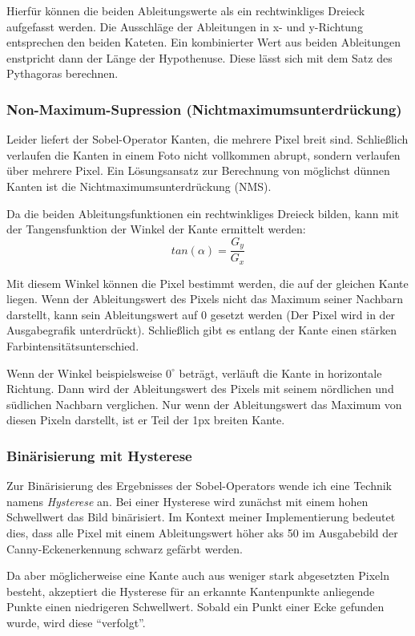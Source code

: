 Hierfür können die beiden Ableitungswerte als ein rechtwinkliges Dreieck aufgefasst werden. Die Ausschläge der Ableitungen in x- und y-Richtung entsprechen den beiden Kateten. Ein kombinierter Wert aus beiden Ableitungen enstpricht dann der Länge der Hypothenuse. Diese lässt sich mit dem Satz des Pythagoras berechnen.

\subsubsection{Non-Maximum-Supression (Nichtmaximumsunterdrückung)}
Leider liefert der Sobel-Operator Kanten, die mehrere Pixel breit sind. Schließlich verlaufen die Kanten in einem Foto nicht vollkommen abrupt, sondern verlaufen über mehrere Pixel. 
Ein Lösungsansatz zur Berechnung von möglichst dünnen Kanten ist die Nichtmaximumsunterdrückung (NMS). 

Da die beiden Ableitungsfunktionen ein rechtwinkliges Dreieck bilden, kann mit der Tangensfunktion der Winkel der Kante ermittelt werden:
\begin{equation}
	tan(\alpha) = \frac{G_y}{G_x}
\end{equation}

Mit diesem Winkel können die Pixel bestimmt werden, die auf der gleichen Kante liegen. Wenn der Ableitungswert des Pixels nicht das Maximum seiner Nachbarn darstellt, kann sein Ableitungswert auf 0 gesetzt werden (Der Pixel wird in der Ausgabegrafik unterdrückt). Schließlich gibt es entlang der Kante einen stärken Farbintensitätsunterschied.  

Wenn der Winkel beispielsweise \(0^{\circ}\) beträgt, verläuft die Kante in horizontale Richtung. Dann wird der Ableitungswert des Pixels mit seinem nördlichen und südlichen Nachbarn verglichen. Nur wenn der Ableitungswert das Maximum von diesen Pixeln darstellt, ist er Teil der 1px breiten Kante.

\subsubsection{Binärisierung mit Hysterese}
Zur Binärisierung des Ergebnisses der Sobel-Operators wende ich eine Technik namens \textit{Hysterese} an. Bei einer Hysterese wird zunächst mit einem hohen Schwellwert das Bild binärisiert. 
Im Kontext meiner Implementierung bedeutet dies, dass alle Pixel mit einem Ableitungswert höher aks 50 im Ausgabebild der Canny-Eckenerkennung schwarz gefärbt werden.

Da aber möglicherweise eine Kante auch aus weniger stark abgesetzten Pixeln besteht, akzeptiert die Hysterese für an erkannte Kantenpunkte anliegende Punkte einen niedrigeren Schwellwert. Sobald ein Punkt einer Ecke gefunden wurde, wird diese "`verfolgt"'.

